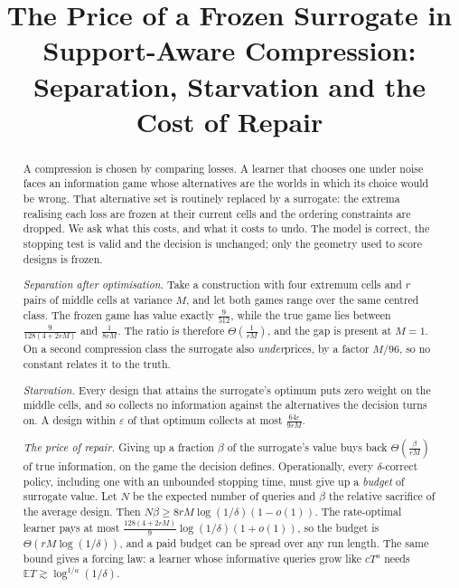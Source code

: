 



\title{The Price of a Frozen Surrogate in Support-Aware Compression:\\
Separation, Starvation and the Cost of Repair}

\author{
}

\maketitle

\begin{abstract}
A compression is chosen by comparing losses. A learner that chooses one under noise faces an
information game whose alternatives are the worlds in which its choice would be wrong. That
alternative set is routinely replaced by a surrogate: the extrema realising each loss are
frozen at their current cells and the ordering constraints are dropped. We ask what this
costs, and what it costs to undo. The model is correct, the stopping test is valid and the
decision is unchanged; only the geometry used to score designs is frozen.

\emph{Separation after optimisation.} Take a construction with four extremum cells and $r$
pairs of middle cells at variance $M$, and let both games range over the same centred class.
The frozen game has value exactly $\frac{9}{512}$, while the true game lies between
$\frac{9}{128(4+2rM)}$ and $\frac{1}{8rM}$. The ratio is therefore $\Theta(\frac{1}{rM})$, and
the gap is present at $M=1$. On a second compression class the surrogate also \emph{under}prices,
by a factor $M/96$, so no constant relates it to the truth.

\emph{Starvation.} Every design that attains the surrogate's optimum puts zero weight on the
middle cells, and so collects no information against the alternatives the decision turns on.
A design within $\varepsilon$ of that optimum collects at most $\frac{64\varepsilon}{9rM}$.

\emph{The price of repair.} Giving up a fraction $\beta$ of the surrogate's value buys back
$\Theta(\frac{\beta}{rM})$ of true information, on the game the decision defines. Operationally,
every $\delta$-correct policy, including one with an unbounded stopping time, must give up a
\emph{budget} of surrogate value. Let $N$ be the expected number of queries and $\beta$ the
relative sacrifice of the average design. Then $N\beta\ge8rM\log(1/\delta)(1-o(1))$. The
rate-optimal learner pays at most $\frac{128(4+2rM)}{9}\log(1/\delta)(1+o(1))$, so the budget is
$\Theta(rM\log(1/\delta))$, and a paid budget can be spread over any run length. The
same bound gives a forcing law: a learner whose informative queries grow like $cT^{a}$ needs
$\mathbb{E}T\gtrsim\log^{1/a}(1/\delta)$.


\end{abstract}

